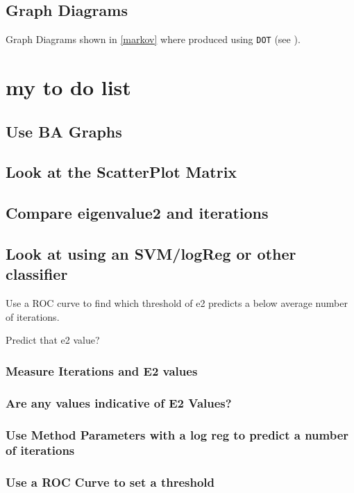 \documentclass[11pt]{article}
\begin{document}
\subsection{Graph Diagrams}
\label{sec:orgc4aeb84}
Graph Diagrams shown in \ref{markov} where produced using \texttt{DOT} (see \cite{DOTLanguage,DOTGraphDescription2020}).
\section{my to do list}
\label{sec:org7d319ec}
\subsection{Use BA Graphs}
\label{sec:org4d81e01}
\subsection{Look at the ScatterPlot Matrix}
\label{sec:org3ce57e4}
\subsection{Compare eigenvalue2 and iterations}
\label{sec:org318b653}

\subsection{Look at using an SVM/logReg or other classifier}
\label{sec:orgdab29a4}
Use a ROC curve to find which threshold of e2 predicts a below average number of iterations.

Predict that e2 value?
\subsubsection{Measure Iterations and E2 values}
\label{sec:orgdbb675e}
\subsubsection{Are any values indicative of E2 Values?}
\label{sec:orgc50c266}
\subsubsection{Use Method Parameters with a log reg to predict a number of iterations}
\label{sec:orgb67a6ec}
\subsubsection{Use a ROC Curve to set a threshold}
\label{sec:org2ec9276}
\end{document}
